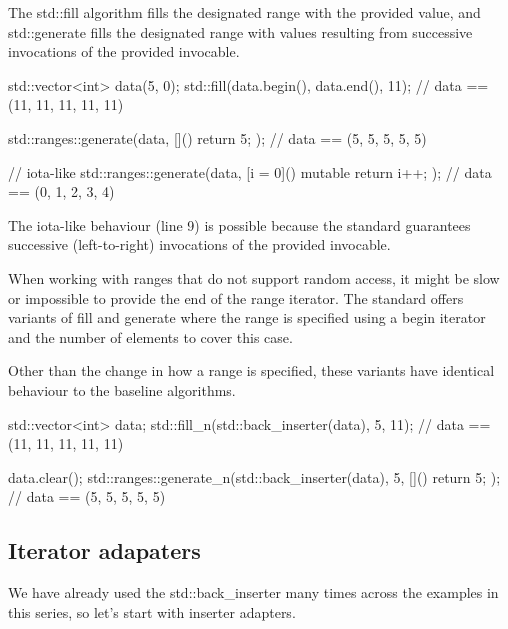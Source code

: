 The std::fill algorithm fills the designated range with the provided value, and std::generate fills the designated range with values resulting from successive invocations of the provided invocable.

\begin{box-note}
\begin{cppcode}
std::vector<int> data(5, 0);
std::fill(data.begin(), data.end(), 11);
// data == (11, 11, 11, 11, 11)

std::ranges::generate(data, []() { return 5; });
// data == (5, 5, 5, 5, 5)

// iota-like
std::ranges::generate(data, [i = 0]() mutable { return i++; });
// data == (0, 1, 2, 3, 4)
\end{cppcode}
\end{box-note}

The iota-like behaviour (line 9) is possible because the standard guarantees successive (left-to-right) invocations of the provided invocable.

When working with ranges that do not support random access, it might be slow or impossible to provide the end of the range iterator. The standard offers variants of fill and generate where the range is specified using a begin iterator and the number of elements to cover this case.



Other than the change in how a range is specified, these variants have identical behaviour to the baseline algorithms.

\begin{box-note}
\begin{cppcode}
std::vector<int> data;
std::fill_n(std::back_inserter(data), 5, 11);
// data == (11, 11, 11, 11, 11)

data.clear();
std::ranges::generate_n(std::back_inserter(data), 5, []() { return 5; });
// data == (5, 5, 5, 5, 5)
\end{cppcode}
\end{box-note}

\subsection{Iterator adapaters}

We have already used the std::back\_inserter many times across the examples in this series, so let's start with inserter adapters.

